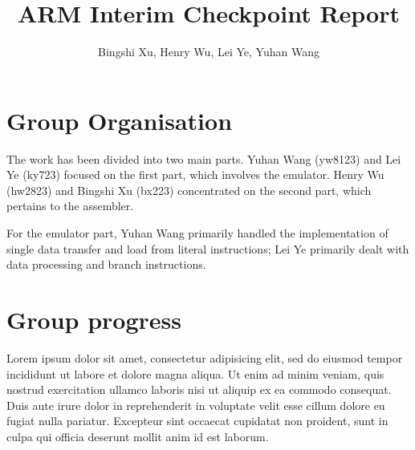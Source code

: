 \documentclass[11pt]{article}
\begin{document}
\title{ARM Interim Checkpoint Report}
\author{Bingshi Xu, Henry Wu, Lei Ye, Yuhan Wang}

\maketitle


\section{Group Organisation}

The work has been divided into two main parts. Yuhan Wang (yw8123) and Lei Ye (ky723) focused on the first part, 
which involves the emulator. 
Henry Wu (hw2823) and Bingshi Xu (bx223) concentrated on the second part, 
which pertains to the assembler.

For the emulator part, Yuhan Wang primarily handled the implementation of single data transfer and load from literal instructions; 
Lei Ye primarily dealt with data processing and branch instructions.


\section{Group progress}
Lorem ipsum dolor sit amet, consectetur adipisicing elit, sed do eiusmod tempor
incididunt ut labore et dolore magna aliqua. Ut enim ad minim veniam, quis
nostrud exercitation ullamco laboris nisi ut aliquip ex ea commodo consequat.
Duis aute irure dolor in reprehenderit in voluptate velit esse cillum dolore eu
fugiat nulla pariatur. Excepteur sint occaecat cupidatat non proident, sunt in
culpa qui officia deserunt mollit anim id est laborum.
\end{document}
